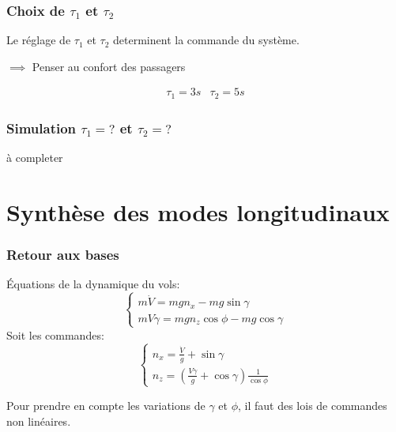 \documentclass[tikz, footheight=2em]{beamer}
\begin{document}
\begin{frame}
    \frametitle{Choix de \( \tau_1 \) et \( \tau_2\)} \pause{}
    Le réglage de \( \tau_1 \) et \( \tau_2\) determinent la commande
    du système.\pause{}
    \begin{center}
        \( \implies \) Penser au confort des passagers
    \end{center}
    \pause{}
    \[
    \boxed{
    \begin{array}{ll}
        \tau_1 =  3s & \tau_2 = 5s
    \end{array}
    }
    \]

\end{frame}

\begin{frame}
    \frametitle{Simulation \( \tau_1 = ? \) et \( \tau_2 = ? \)} \pause{}
    \begin{center}
        à completer
    \end{center}
\end{frame}

\section{Synthèse des modes longitudinaux}


\begin{frame}
    \frametitle{Retour aux bases} \pause{}
    Équations de la dynamique du vols:
    \[
    \left \{
    \begin{array}{l}
        m \dot{V} = mg n_x - mg \sin \gamma \\
        m V \dot{\gamma} = mg n_z \cos \phi - mg \cos \gamma
    \end{array}
    \right.
    \]\pause{}
    Soit les commandes:
    \[
    \left \{
    \begin{array}{l}
        n_x = \frac{\dot{V}}{g} + \sin \gamma \\
        n_z = \left(\frac{V \dot{\gamma}}{g} + \cos \gamma\right)
        \frac{1}{\cos \phi}
    \end{array}
    \right.
    \]\pause{}
    \begin{center}
        Pour prendre en compte les variations de \( \gamma \) et \( \phi \), il
        faut des lois de commandes non linéaires.
    \end{center}
\end{frame}
\end{document}

